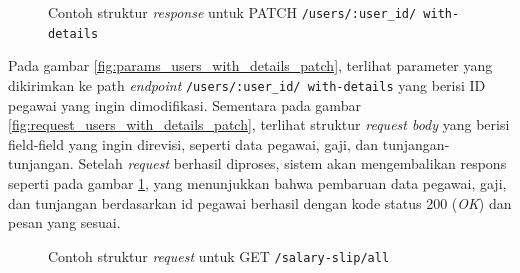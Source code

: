 \begin{figure}
    \centering
    \caption{Contoh struktur \textit{response} untuk PATCH \texttt{/users/{:user\_id}/ with-details}}
    \label{fig:response_users_with_details_patch}
\end{figure}

Pada gambar \ref{fig:params_users_with_details_patch}, terlihat parameter yang dikirimkan ke path \textit{endpoint} \texttt{/users/{:user\_id}/ with-details} yang berisi ID pegawai yang ingin dimodifikasi. Sementara pada gambar \ref{fig:request_users_with_details_patch}, terlihat struktur \textit{request body} yang berisi field-field yang ingin direvisi, seperti data pegawai, gaji, dan tunjangan-tunjangan. Setelah \textit{request} berhasil diproses, sistem akan mengembalikan respons seperti pada gambar \ref{fig:response_users_with_details_patch}, yang menunjukkan bahwa pembaruan data pegawai, gaji, dan tunjangan berdasarkan id pegawai berhasil dengan kode status 200 (\textit{OK}) dan pesan yang sesuai.


\begin{figure}
    \centering
    \caption{Contoh struktur \textit{request} untuk GET \texttt{/salary-slip/all}}
    \label{fig:request_salary_slip_all_get}
\end{figure}

